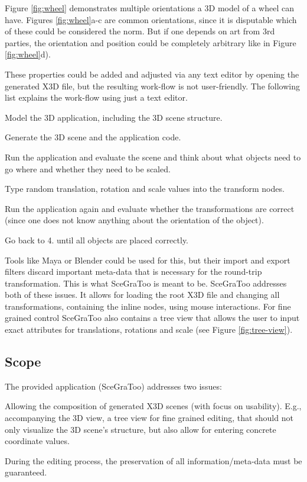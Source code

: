 Figure \ref{fig:wheel} demonstrates multiple orientations a \gls{3D} model of a wheel can have. Figures \ref{fig:wheel}a-c are common
orientations, since it is disputable which of these could be considered the
norm. But if one depends on art from 3rd parties, the orientation and position
could be completely arbitrary like in Figure \ref{fig:wheel}d).

These properties could be added and adjusted via any text editor by opening the
generated \gls{X3D} file, but the resulting work-flow is not user-friendly. The
following list explains the work-flow using just a text editor.

\begin{enumerate*}
  \item Model the \gls{3D} application, including the \gls{3D} scene structure.
  \item Generate the \gls{3D} scene and the application code.
  \item Run the application and evaluate the scene and think about what objects need to go where and whether they need to be scaled.
  \item Type random translation, rotation and scale values into the transform nodes.
  \item Run the application again and evaluate whether the transformations are correct (since one does not know anything about the orientation of the object).
  \item Go back to 4. until all objects are placed correctly.
\end{enumerate*}

Tools like Maya or Blender could be used for this, but their import
and export filters discard important meta-data that is necessary for the
round-trip transformation. This is what \gls{SceGraToo} is meant to be. \gls{SceGraToo} addresses both of these issues. It allows for loading the root \gls{X3D} file and changing all transformations, containing the inline nodes,
using mouse interactions. For fine grained control \gls{SceGraToo} also
contains a tree view that allows the user to input exact attributes for
translations, rotations and scale (see Figure \ref{fig:tree-view}).

\subsection{Scope}\label{scope}

The provided application (\gls{SceGraToo}) addresses two issues:

\begin{enumerate*}
  \item Allowing the composition of generated \gls{X3D} scenes (with focus on usability). E.g., accompanying the \gls{3D} view, a tree view for fine grained editing, that should not only visualize the \gls{3D} scene's structure, but also allow for entering concrete coordinate values.
  \item During the editing process, the preservation of all information/meta-data must be guaranteed.
\end{enumerate*}
